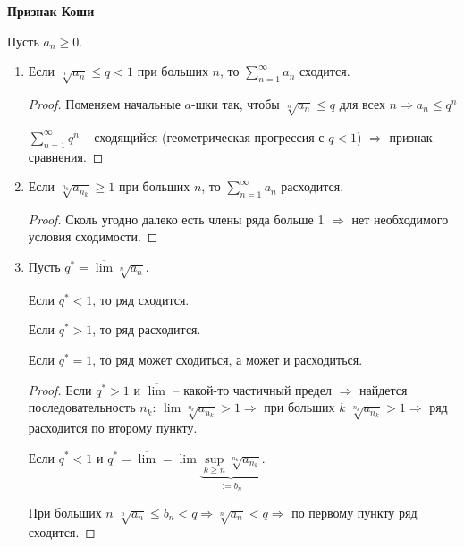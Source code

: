 \begin{theorem}
    \textbf{Признак Коши}

    Пусть $a_n\geq 0$.

    \begin{enumerate}
        \item  Если $\sqrt[n]{a_n}\leq q< 1$ при больших $n$, то $\sum\limits_{n=1}^\infty a_n$ сходится.
        \begin{proof}
            Поменяем начальные $a$-шки так, чтобы $\sqrt[n]{a_n}\leq q$ для всех $n\Rightarrow a_n\leq q^n$

            $\sum\limits_{n=1}^\infty q^n$ – сходящийся (геометрическая прогрессия с $q < 1$) $\Rightarrow $ признак сравнения.
        \end{proof}

        \item Если $\sqrt[n_k]{a_{n_k}}\geq 1$ при больших $n$, то $\sum\limits_{n=1}^\infty a_n$ расходится.

        \begin{proof}
            Сколь угодно далеко есть члены ряда больше 1 $\Rightarrow$ нет необходимого условия сходимости.
        \end{proof}
        \item Пусть $q^*=\overline{\lim}\sqrt[n]{a_n}$. 

        Если $q^*<1$, то ряд сходится.
        
        Если $q^*>1$, то ряд расходится.
        
        \begin{remark}
            Если $q^*=1$, то ряд может сходиться, а может и расходиться.
        \end{remark}

        \begin{proof}
            Если $q^*>1$ и $\overline{\lim}$ – какой-то частичный предел $\Rightarrow$ найдется последовательность $n_k$: $\lim\sqrt[n_k]{a_{n_k}}>1\Rightarrow$ при больших $k$ $\sqrt[n_k]{a_{n_k}}>1\Rightarrow$ ряд расходится по второму пункту.

            Если $q^*<1$ и $q^*=\overline{\lim}=\lim\underbrace{\sup\limits_{k\geq n} \sqrt[n_k]{a_{n_k}}}_{:=b_n}$.

            При больших $n$ $\sqrt[n]{a_n}\leq b_n<q\Rightarrow \sqrt[n]{a_n}<q\Rightarrow$ по первому пункту ряд сходится.
        \end{proof}
    \end{enumerate}
\end{theorem}


